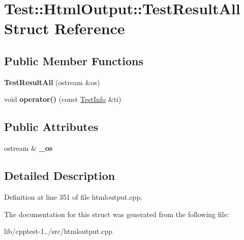 \hypertarget{struct_test_1_1_html_output_1_1_test_result_all}{}\section{Test\+:\+:Html\+Output\+:\+:Test\+Result\+All Struct Reference}
\label{struct_test_1_1_html_output_1_1_test_result_all}
\subsection*{Public Member Functions}
\begin{DoxyCompactItemize}
\item 
{\bfseries Test\+Result\+All} (ostream \&os)\hypertarget{struct_test_1_1_html_output_1_1_test_result_all_a592ec25b7410b62cd5ae6bc7eeebe64b}{}\label{struct_test_1_1_html_output_1_1_test_result_all_a592ec25b7410b62cd5ae6bc7eeebe64b}

\item 
void {\bfseries operator()} (const \hyperlink{struct_test_1_1_collector_output_1_1_test_info}{Test\+Info} \&ti)\hypertarget{struct_test_1_1_html_output_1_1_test_result_all_accebc340ecf96cc31657848029703e72}{}\label{struct_test_1_1_html_output_1_1_test_result_all_accebc340ecf96cc31657848029703e72}

\end{DoxyCompactItemize}
\subsection*{Public Attributes}
\begin{DoxyCompactItemize}
\item 
ostream \& {\bfseries \+\_\+os}\hypertarget{struct_test_1_1_html_output_1_1_test_result_all_a101d2548b8d3da81bb9e8e940435158f}{}\label{struct_test_1_1_html_output_1_1_test_result_all_a101d2548b8d3da81bb9e8e940435158f}

\end{DoxyCompactItemize}


\subsection{Detailed Description}


Definition at line 351 of file htmloutput.\+cpp.



The documentation for this struct was generated from the following file\+:\begin{DoxyCompactItemize}
\item 
lib/cpptest-\/1../src/htmloutput.\+cpp\end{DoxyCompactItemize}
